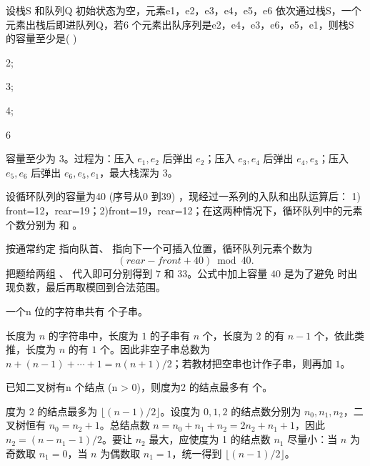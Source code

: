 \begin{question}
设栈S 和队列Q 初始状态为空，元素e1，e2，e3，e4，e5，e6 依次通过栈S，一个元素出栈后即进队列Q，若6 个元素出队序列是e2，e4，e3，e6，e5，e1，则栈S 的容量至少是(       )\\
\begin{choiceoptions}
  \item 2;
  \item 3;
  \item 4;
  \item 6
\end{choiceoptions}
\begin{solution}
容量至少为 3。过程为：压入 $e_1,e_2$ 后弹出 $e_2$；压入 $e_3,e_4$ 后弹出 $e_4,e_3$；压入 $e_5,e_6$ 后弹出 $e_6,e_5,e_1$，最大栈深为 3。
\end{solution}
\end{question}

\begin{question}
设循环队列的容量为40 (序号从0 到39) ，现经过一系列的入队和出队运算后： 1) front=12，rear=19；2)front=19，rear=12；在这两种情况下，循环队列中的元素个数分别为 \blank 和 \blank 。\\
\begin{solution}
按通常约定 \texttt{} 指向队首、\texttt{} 指向下一个可插入位置，循环队列元素个数为
\[
(rear-front+40)\bmod40.
\]
把题给两组 \texttt{}、\texttt{} 代入即可分别得到 $7$ 和 $33$。公式中加上容量 $40$ 是为了避免 \texttt{} 时出现负数，最后再取模回到合法范围。
\end{solution}
\end{question}

\begin{question}
一个n 位的字符串共有 \blank 个子串。\\
\begin{solution}
长度为 $n$ 的字符串中，长度为 $1$ 的子串有 $n$ 个，长度为 $2$ 的有 $n-1$ 个，依此类推，长度为 $n$ 的有 $1$ 个。因此非空子串总数为 $n+(n-1)+\cdots+1=n(n+1)/2$；若教材把空串也计作子串，则再加 $1$。
\end{solution}
\end{question}

\begin{question}
已知二叉树有n 个结点 (n > 0)，则度为2 的结点最多有 \blank 个。\\
\begin{solution}
度为 2 的结点最多为 $\lfloor(n-1)/2\rfloor$。设度为 $0,1,2$ 的结点数分别为 $n_0,n_1,n_2$，二叉树恒有 $n_0=n_2+1$。总结点数 $n=n_0+n_1+n_2=2n_2+n_1+1$，因此 $n_2=(n-n_1-1)/2$。要让 $n_2$ 最大，应使度为 1 的结点数 $n_1$ 尽量小：当 $n$ 为奇数取 $n_1=0$，当 $n$ 为偶数取 $n_1=1$，统一得到 $\lfloor(n-1)/2\rfloor$。
\end{solution}
\end{question}

